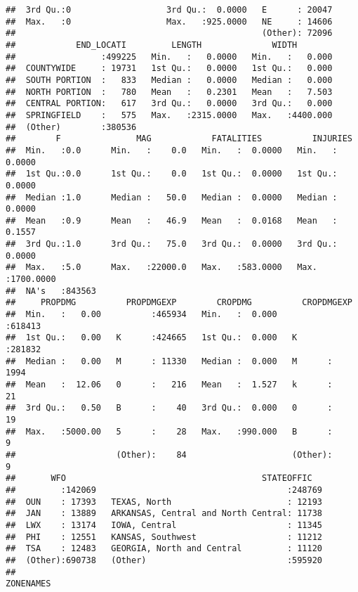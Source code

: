 \documentclass[]{article}
\begin{document}
\begin{verbatim}
##  3rd Qu.:0                   3rd Qu.:  0.0000   E      : 20047  
##  Max.   :0                   Max.   :925.0000   NE     : 14606  
##                                                 (Other): 72096  
##            END_LOCATI         LENGTH              WIDTH         
##                 :499225   Min.   :   0.0000   Min.   :   0.000  
##  COUNTYWIDE     : 19731   1st Qu.:   0.0000   1st Qu.:   0.000  
##  SOUTH PORTION  :   833   Median :   0.0000   Median :   0.000  
##  NORTH PORTION  :   780   Mean   :   0.2301   Mean   :   7.503  
##  CENTRAL PORTION:   617   3rd Qu.:   0.0000   3rd Qu.:   0.000  
##  SPRINGFIELD    :   575   Max.   :2315.0000   Max.   :4400.000  
##  (Other)        :380536                                         
##        F               MAG            FATALITIES          INJURIES        
##  Min.   :0.0      Min.   :    0.0   Min.   :  0.0000   Min.   :   0.0000  
##  1st Qu.:0.0      1st Qu.:    0.0   1st Qu.:  0.0000   1st Qu.:   0.0000  
##  Median :1.0      Median :   50.0   Median :  0.0000   Median :   0.0000  
##  Mean   :0.9      Mean   :   46.9   Mean   :  0.0168   Mean   :   0.1557  
##  3rd Qu.:1.0      3rd Qu.:   75.0   3rd Qu.:  0.0000   3rd Qu.:   0.0000  
##  Max.   :5.0      Max.   :22000.0   Max.   :583.0000   Max.   :1700.0000  
##  NA's   :843563                                                           
##     PROPDMG          PROPDMGEXP        CROPDMG          CROPDMGEXP    
##  Min.   :   0.00          :465934   Min.   :  0.000          :618413  
##  1st Qu.:   0.00   K      :424665   1st Qu.:  0.000   K      :281832  
##  Median :   0.00   M      : 11330   Median :  0.000   M      :  1994  
##  Mean   :  12.06   0      :   216   Mean   :  1.527   k      :    21  
##  3rd Qu.:   0.50   B      :    40   3rd Qu.:  0.000   0      :    19  
##  Max.   :5000.00   5      :    28   Max.   :990.000   B      :     9  
##                    (Other):    84                     (Other):     9  
##       WFO                                       STATEOFFIC    
##         :142069                                      :248769  
##  OUN    : 17393   TEXAS, North                       : 12193  
##  JAN    : 13889   ARKANSAS, Central and North Central: 11738  
##  LWX    : 13174   IOWA, Central                      : 11345  
##  PHI    : 12551   KANSAS, Southwest                  : 11212  
##  TSA    : 12483   GEORGIA, North and Central         : 11120  
##  (Other):690738   (Other)                            :595920  
##                                                                                                                                                                                                     ZONENAMES     

\end{verbatim}
\end{document}

